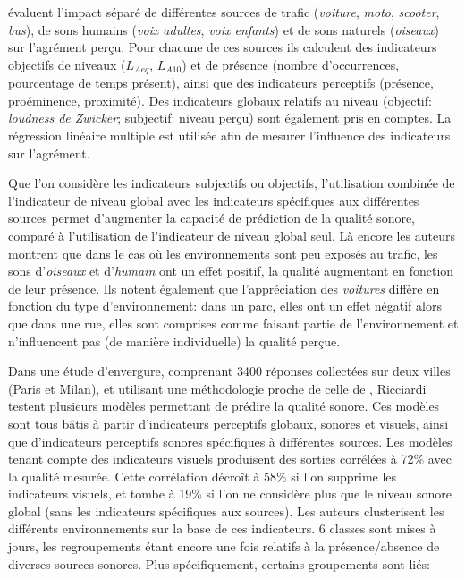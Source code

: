 \citep{defreville2004aactivity,lavandier2006contribution} évaluent l'impact séparé de différentes sources de trafic (\emph{voiture}, \emph{moto}, \emph{scooter}, \emph{bus}), de sons humains (\emph{voix adultes}, \emph{voix enfants}) et de sons naturels (\emph{oiseaux}) sur l'agrément perçu. Pour chacune de ces sources ils  calculent des indicateurs objectifs de niveaux ($L_{Aeq}$, $L_{A10}$) et de présence (nombre d’occurrences, pourcentage de temps présent), ainsi que des indicateurs perceptifs (présence, proéminence, proximité). Des indicateurs globaux relatifs au niveau (objectif: \emph{loudness de Zwicker}; subjectif: niveau perçu) sont également pris en comptes. La régression linéaire multiple est utilisée afin de mesurer l'influence des indicateurs sur l'agrément.

Que l'on considère les indicateurs subjectifs ou objectifs, l'utilisation combinée de l'indicateur de niveau global avec les indicateurs spécifiques aux différentes sources permet d'augmenter la capacité de prédiction de la qualité sonore, comparé à l'utilisation de l'indicateur de niveau global seul. Là encore les auteurs montrent que dans le cas où les environnements sont peu exposés au trafic, les sons d'\emph{oiseaux} et d'\emph{humain} ont un effet positif, la qualité augmentant en fonction de leur présence. Ils notent également que l'appréciation des \emph{voitures} diffère en fonction du type d'environnement: dans un parc, elles ont un effet négatif alors que dans une rue, elles sont comprises comme faisant partie de l'environnement et n'influencent pas (de manière individuelle) la qualité perçue.

Dans une étude d'envergure, comprenant 3400 réponses collectées sur deux villes (Paris et Milan), et utilisant une méthodologie proche de celle de \citep{lavandier2006contribution}, Ricciardi~\al \citep{ricciardi2015sound} testent plusieurs modèles permettant de prédire la qualité sonore. Ces modèles sont tous bâtis à partir d'indicateurs perceptifs globaux, sonores et visuels, ainsi que d'indicateurs perceptifs sonores spécifiques à différentes sources. Les modèles tenant compte des indicateurs visuels produisent des sorties corrélées à 72\% avec la qualité mesurée. Cette corrélation décroît à 58\% si l'on supprime les indicateurs visuels, et tombe à 19\% si l'on ne considère plus que le niveau sonore global (sans les indicateurs spécifiques aux sources). Les auteurs clusterisent les différents environnements sur la base de ces indicateurs. 6 classes sont mises à jours, les regroupements étant encore une fois relatifs à la présence/absence de diverses sources sonores. Plus spécifiquement, certains groupements sont liés:

